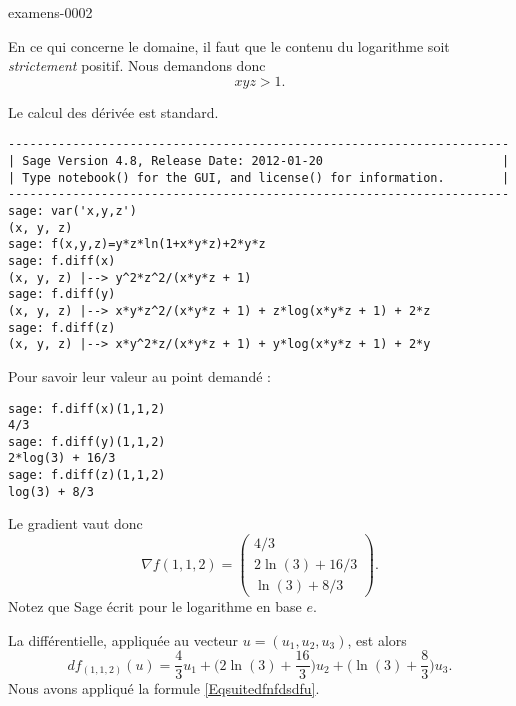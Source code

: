
\begin{corrige}{examens-0002}

    En ce qui concerne le domaine, il faut que le contenu du logarithme soit \emph{strictement} positif. Nous demandons donc
    \begin{equation}
        xyz>1.
    \end{equation}

    Le calcul des dérivée est standard. 
    \begin{verbatim}
----------------------------------------------------------------------
| Sage Version 4.8, Release Date: 2012-01-20                         |
| Type notebook() for the GUI, and license() for information.        |
----------------------------------------------------------------------
sage: var('x,y,z')
(x, y, z)
sage: f(x,y,z)=y*z*ln(1+x*y*z)+2*y*z
sage: f.diff(x)
(x, y, z) |--> y^2*z^2/(x*y*z + 1)
sage: f.diff(y)
(x, y, z) |--> x*y*z^2/(x*y*z + 1) + z*log(x*y*z + 1) + 2*z
sage: f.diff(z)
(x, y, z) |--> x*y^2*z/(x*y*z + 1) + y*log(x*y*z + 1) + 2*y
    \end{verbatim}

Pour savoir leur valeur au point demandé :

    \begin{verbatim}
sage: f.diff(x)(1,1,2)         
4/3
sage: f.diff(y)(1,1,2)
2*log(3) + 16/3
sage: f.diff(z)(1,1,2)
log(3) + 8/3
    \end{verbatim}
    

    Le gradient vaut donc
    \begin{equation}
        \nabla f(1,1,2)=\begin{pmatrix}
            4/3\\ 
            2\ln(3)+16/3    \\ 
            \ln(3)+8/3    
        \end{pmatrix}.
    \end{equation}
    Notez que Sage écrit  pour le logarithme en base \( e\).

    La différentielle, appliquée au vecteur \( u=(u_1,u_2,u_3)\), est alors
    \begin{equation}
        df_{(1,1,2)}(u)=\frac{ 4 }{ 3 }u_1+\big( 2\ln(3)+\frac{ 16 }{ 3 } \big)u_2+\big( \ln(3)+\frac{ 8 }{ 3 } \big)u_3.
    \end{equation}
    Nous avons appliqué la formule \eqref{Eqsuitedfnfdsdfu}.
    
\end{corrige}
